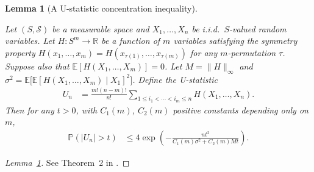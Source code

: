 \documentclass[11pt,lof]{puthesis}
\renewcommand{\P}{\ensuremath{\mathbb{P}}}
\newcommand{\R}{\ensuremath{\mathbb{R}}}
\newcommand{\E}{\ensuremath{\mathbb{E}}}
\newcommand{\cS}{\ensuremath{\mathcal{S}}}
\theoremstyle{break}
\newtheorem{lemma}{Lemma}[section]
\theoremstyle{proof}
\newtheorem{proof}{Proof}
\begin{document}
\begin{lemma}[A U-statistic concentration inequality]
  \label{lem:kernel_app_ustat_concentration}

  Let $(S,\cS)$ be a measurable space and
  $X_1, \ldots, X_n$ be i.i.d.\ $S$-valued random variables.
  Let $H: S^m \to \R$ be a function of $m$ variables
  satisfying the symmetry property
  $H(x_1, \ldots, x_m) = H(x_{\tau (1)}, \ldots, x_{\tau (m)})$
  for any $m$-permutation $\tau$.
  Suppose also that
  $\E[H(X_1, \ldots, X_m)] = 0$.
  Let $M = \|H\|_\infty$ and $\sigma^2 = \E\big[\E[H(X_1, \ldots, X_m) \mid
  X_1]^2\big]$.
  Define the U-statistic
  \begin{align*}
    U_n
    &=
    \frac{m!(n-m)!}{n!}
    \sum_{1 \leq i_1 < \cdots < i_m \leq n}
    H(X_1, \ldots, X_n).
  \end{align*}
  Then for any $t > 0$,
  with $C_1(m)$, $C_2(m)$
  positive constants depending only on $m$,
  \begin{align*}
    \P\left(
      |U_n| > t
    \right)
    &\leq
    4 \exp \left(
      - \frac{n t^2}{C_1(m) \sigma^2 + C_2(m) M t}
    \right).
  \end{align*}
\end{lemma}

\begin{proof}[Lemma~\ref{lem:kernel_app_ustat_concentration}]
  See Theorem~2 in \citet{arcones1995bernstein}.
\end{proof}
\end{document}
